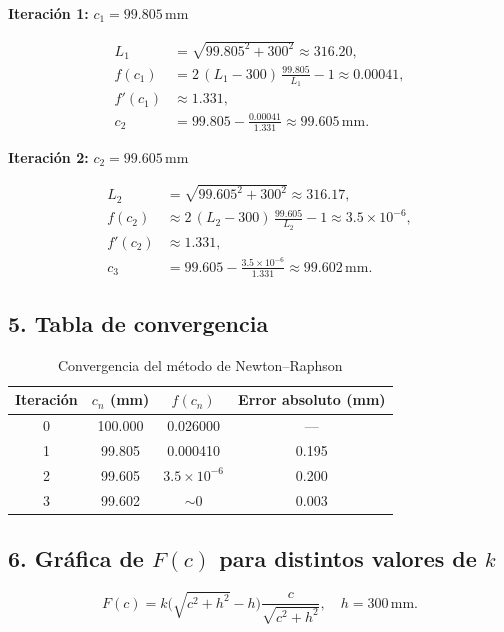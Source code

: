 \documentclass[12pt]{article}
\begin{document}
\textbf{Iteración 1:} \(c_1 = 99.805\,\mathrm{mm}\)

\begin{align*}
L_1 &= \sqrt{99.805^2 + 300^2} \approx 316.20,\\
f(c_1) &= 2\,(L_1 - 300)\,\frac{99.805}{L_1} - 1 \approx 0.00041,\\
f'(c_1) &\approx 1.331,\\
c_2 &= 99.805 - \frac{0.00041}{1.331} \approx 99.605\,\mathrm{mm}.
\end{align*}

\textbf{Iteración 2:} \(c_2 = 99.605\,\mathrm{mm}\)

\begin{align*}
L_2 &= \sqrt{99.605^2 + 300^2} \approx 316.17,\\
f(c_2) &\approx 2\,(L_2 - 300)\,\frac{99.605}{L_2} - 1 \approx 3.5\times10^{-6},\\
f'(c_2) &\approx 1.331,\\
c_3 &= 99.605 - \frac{3.5\times10^{-6}}{1.331} \approx 99.602\,\mathrm{mm}.
\end{align*}

\subsection*{5. Tabla de convergencia}

\begin{table}[H]
\centering
\begin{tabular}{@{}cccc@{}}
\toprule
Iteración & \(c_n\) (mm) & \(f(c_n)\) & Error absoluto (mm) \\ \midrule
0 & 100.000 & 0.026000          & —     \\
1 &  99.805 & 0.000410          & 0.195 \\
2 &  99.605 & \(3.5\times10^{-6}\) & 0.200 \\
3 &  99.602 & \(\sim0\)         & 0.003 \\
\bottomrule
\end{tabular}
\caption{Convergencia del método de Newton–Raphson}
\end{table}

\subsection*{6. Gráfica de \(F(c)\) para distintos valores de \(k\)}

\[
F(c) = k\bigl(\sqrt{c^2 + h^2}-h\bigr)\frac{c}{\sqrt{c^2 + h^2}},\quad h=300\,\mathrm{mm}.
\]
\end{document}
